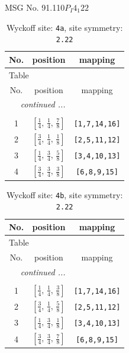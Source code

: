 \documentclass[fleqn,8pt]{jsarticle}
\begin{document}
\setcounter{MaxMatrixCols}{32}

\renewcommand{\tablename}{Table~}
\renewcommand{\figurename}{Figure~}
\begin{center}
\LARGE
MSG No. 91.110\quad$P_{I}4_{1}22$
\end{center}
\renewcommand{\arraystretch}{1.2}
\begin{longtable}{ccc}
\caption{Wyckoff site: {\tt 4a}, site symmetry: {\tt 2.22}}
 \\
 \hline \hline
No. & position & mapping \\ \hline \endfirsthead

\multicolumn{2}{l}{\tablename\ \thetable{}} \\
 \hline \hline
No. & position & mapping \\ \hline \endhead

 \hline \hline
\multicolumn{2}{r}{\footnotesize\it continued ...} \\ \endfoot

 \hline \hline
\multicolumn{2}{r}{} \\ \endlastfoot

1 & $\left[ \frac{1}{4},\, \frac{1}{4},\, \frac{7}{8} \right]$ & {\tt [1,7,14,16]} \\ \hline
2 & $\left[ \frac{3}{4},\, \frac{1}{4},\, \frac{1}{8} \right]$ & {\tt [2,5,11,12]} \\ \hline
3 & $\left[ \frac{1}{4},\, \frac{3}{4},\, \frac{5}{8} \right]$ & {\tt [3,4,10,13]} \\ \hline
4 & $\left[ \frac{3}{4},\, \frac{3}{4},\, \frac{3}{8} \right]$ & {\tt [6,8,9,15]} \\
\end{longtable}
\renewcommand{\arraystretch}{1.2}
\begin{longtable}{ccc}
\caption{Wyckoff site: {\tt 4b}, site symmetry: {\tt 2.22}}
 \\
 \hline \hline
No. & position & mapping \\ \hline \endfirsthead

\multicolumn{2}{l}{\tablename\ \thetable{}} \\
 \hline \hline
No. & position & mapping \\ \hline \endhead

 \hline \hline
\multicolumn{2}{r}{\footnotesize\it continued ...} \\ \endfoot

 \hline \hline
\multicolumn{2}{r}{} \\ \endlastfoot

1 & $\left[ \frac{1}{4},\, \frac{1}{4},\, \frac{3}{8} \right]$ & {\tt [1,7,14,16]} \\ \hline
2 & $\left[ \frac{3}{4},\, \frac{1}{4},\, \frac{5}{8} \right]$ & {\tt [2,5,11,12]} \\ \hline
3 & $\left[ \frac{1}{4},\, \frac{3}{4},\, \frac{1}{8} \right]$ & {\tt [3,4,10,13]} \\ \hline
4 & $\left[ \frac{3}{4},\, \frac{3}{4},\, \frac{7}{8} \right]$ & {\tt [6,8,9,15]} \\
\end{longtable}
\end{document}
